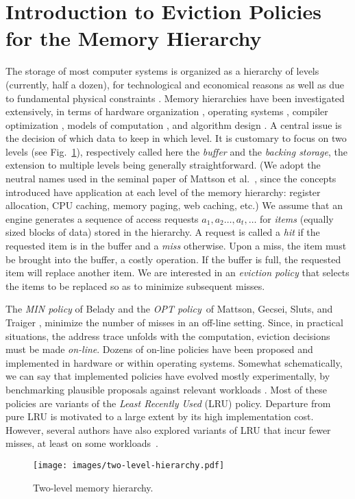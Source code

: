 \documentclass[11pt,a4paper]{article}
\theoremstyle{definition}
\theoremstyle{remark}
\begin{document}
\section{Introduction to Eviction Policies for the Memory Hierarchy}
\label{chap:an-optimal-control}


The storage of most computer systems is organized as a hierarchy of
levels (currently, half a dozen), for technological and economical
reasons \cite{HennessyP06} as well as due to fundamental physical
constraints \cite{BilardiP95}. Memory hierarchies have been
investigated extensively, in terms of hardware organization
\cite{Fotheringham61,Przybylski90,HennessyP06}, operating systems
\cite{SilberschatzGG05}, compiler optimization
\cite{AllenK02,Wolfe95,GuoGP03}, models of computation
\cite{Savage97}, and algorithm design \cite{AggarwalACS87}.  A central
issue is the decision of which data to keep in which level.  It is
customary to focus on two levels (see Fig.~\ref{two-lev-hier}),
respectively called here the \emph{buffer} and the \emph{backing
  storage}, the extension to multiple levels being generally
straightforward. (We adopt the neutral names used in the seminal paper
of Mattson et al.\ \cite{MattsonGST70}, since the concepts introduced
have application at each level of the memory hierarchy: register
allocation, CPU caching, memory paging, web caching, etc.) We assume
that an engine generates a sequence of access requests $a_1, a_2
\ldots, a_t, \ldots$ for \emph{items} (equally sized blocks of data)
stored in the hierarchy.  A request is called a \emph{hit} if the
requested item is in the buffer and a \emph{miss} otherwise. Upon a
miss, the item must be brought into the buffer, a costly operation.
If the buffer is full, the requested item will replace another
item. We are interested in an \emph{eviction policy} that selects the
items to be replaced so as to minimize subsequent misses.

The \emph{MIN policy} of Belady \cite{Belady66} and the \emph{OPT
  policy}\footnotemark\ of Mattson, Gecsei, Sluts, and Traiger
\cite{MattsonGST70}, minimize the number of misses in an off-line
setting.  Since, in
practical situations, the address trace unfolds with the computation, eviction
decisions must be made \emph{on-line}.  Dozens of on-line policies have been
proposed and implemented in hardware or within operating systems.
Somewhat schematically, we can say that implemented policies have evolved mostly
experimentally, by benchmarking plausible proposals against relevant workloads
\cite{Przybylski90}.  Most of these policies are variants of the \emph{Least
  Recently Used} (LRU) policy. Departure from pure LRU is motivated to a large
extent by its high implementation cost.  However, several authors have also
explored variants of LRU that incur fewer misses, at least on some
workloads~\cite{MegiddoM04}.
\begin{figure}
  \centering  \texttt{[image: images/two-level-hierarchy.pdf]}
  \caption{Two-level memory hierarchy.}
  \label{two-lev-hier}
\end{figure}
\end{document}
